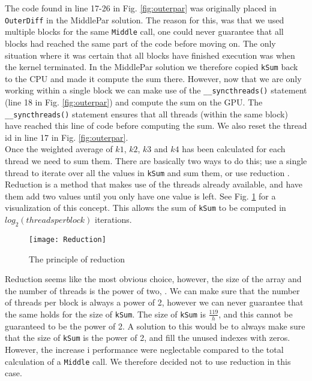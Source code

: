 The code found in line 17-26 in Fig. \ref{fig:outerpar} was originally placed in \texttt{OuterDiff} in the MiddlePar solution. The reason for this, was that we used multiple blocks for the same \texttt{Middle} call, one could never guarantee that all blocks had reached the same part of the code before moving on. The only situation where it was certain that all blocks have finished execution was when the kernel terminated. In the MiddlePar solution we therefore copied \texttt{kSum} back to the CPU and made it compute the sum there. However, now that we are only working within a single block we can make use of the \texttt{\_\_syncthreads()} statement (line 18 in Fig. \ref{fig:outerpar}) and compute the sum on the GPU. The \texttt{\_\_syncthreads()} statement ensures that all threads (within the same block) have reached this line of code before computing the sum. We also reset the thread id in line 17 in Fig. \ref{fig:outerpar}.\\

Once the weighted average of $k1$, $k2$, $k3$ and $k4$ has been calculated for each thread we need to sum them. There are basically two ways to do this; use a single thread to iterate over all the values in \texttt{kSum} and sum them, or use reduction \cite{byexample}. Reduction is a method that makes use of the threads already available, and have them add two values until you only have one value is left. See Fig. \ref{fig:reduction} for a visualization of this concept. This allows the sum of \texttt{kSum} to be computed in $log_2 (threadsperblock)$ iterations.\\

\begin{figure}[ht!]
  \centering
    \texttt{[image: Reduction]}
  \caption{The principle of reduction \cite{byexample}}
  \label{fig:reduction}
\end{figure}

Reduction seems like the most obvious choice, however, the size of the array and the number of threads is the power of two, \cite{byexample}. We can make sure that the number of threads per block is always a power of 2, however we can never guarantee that the same holds for the size of \texttt{kSum}. The size of \texttt{kSum} is $\frac{119}{h}$, and this cannot be guaranteed to be the power of 2. A solution to this would be to always make sure that the size of \texttt{kSum} is the power of 2, and fill the unused indexes with zeros. However, the increase i performance were neglectable compared to the total calculation of a \texttt{Middle} call. We therefore decided not to use reduction in this case.\\


